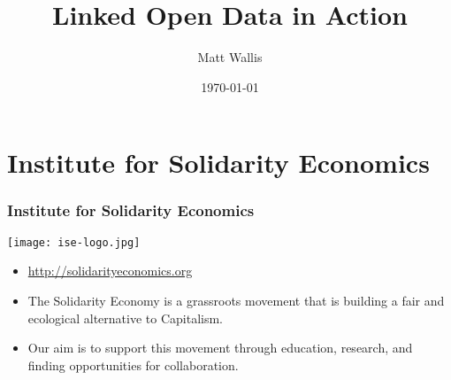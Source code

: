 
\usepackage{beamerthemesplit}
\usepackage{tikz}
\usetikzlibrary{arrows.meta,shapes,backgrounds,positioning,shapes.multipart}
\usepackage{textpos} 
\usepackage{hyperref}
\usepackage{graphicx}
\usepackage{calc}
\newlength{\popupimagewidth}

\setlength{\popupimagewidth}{\textwidth*3/5}


\title{Linked Open Data in Action}
\author{Matt Wallis}
\date{\today}




\frame{\titlepage}

\frame{\tableofcontents}

\section{Institute for Solidarity Economics}
\frame
{
  \frametitle{Institute for Solidarity Economics}
  \begin{center}
    \texttt{[image: ise-logo.jpg]}
  \end{center}
  \begin{itemize}
    \item<1-> \url{http://solidarityeconomics.org}
    \item<1-> The Solidarity Economy is a grassroots movement that is building a fair and ecological alternative to Capitalism.
    \item<1-> Our aim is to support this movement through education, research, and finding opportunities for collaboration.
  \end{itemize}
}
